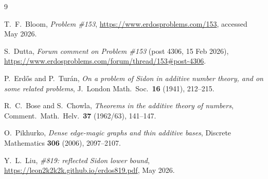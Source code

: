 \documentclass[11pt]{amsart}
\begin{document}
\begin{thebibliography}{9}

T.~F.~Bloom,
\emph{\Erdos Problem \#153},
\url{https://www.erdosproblems.com/153},
accessed May 2026.

S.~Dutta,
\emph{Forum comment on \Erdos Problem \#153} (post 4306, 15 Feb 2026),
\url{https://www.erdosproblems.com/forum/thread/153\#post-4306}.

P.~Erd\H{o}s and P.~Tur\'an,
\emph{On a problem of Sidon in additive number theory, and on some related problems},
J.~London Math.\ Soc.\ \textbf{16} (1941), 212--215.

R.~C.~Bose and S.~Chowla,
\emph{Theorems in the additive theory of numbers},
Comment.\ Math.\ Helv.\ \textbf{37} (1962/63), 141--147.

O.~Pikhurko,
\emph{Dense edge-magic graphs and thin additive bases},
Discrete Mathematics \textbf{306} (2006), 2097--2107.

Y.~L.~Liu,
\emph{\Erdos \#819: reflected Sidon lower bound},
\url{https://leon2k2k2k.github.io/erdos819.pdf}, May 2026.

\end{thebibliography}
\end{document}
